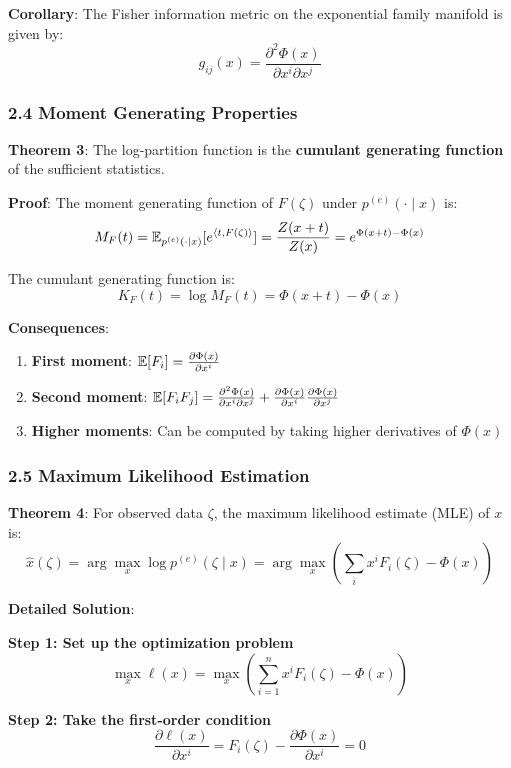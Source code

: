\documentclass{amsart}
\let\originalmathbb\mathbb
\renewcommand{\mathbb}[1]{%
    \ifstrequal{#1}{1}{\mathbbm{#1}}{\originalmathbb{#1}}%
}
\theoremstyle{plain}
\theoremstyle{definition}
\theoremstyle{remark}
\begin{document}
\textbf{Corollary}: The Fisher information metric on the exponential family manifold is given by:
\[
g_{ij}(x) = \frac{\partial^2 \Phi(x)}{\partial x^i \partial x^j}
\]

\subsubsection{2.4 Moment Generating Properties}

\textbf{Theorem 3}: The log-partition function is the \textbf{cumulant generating function} of the sufficient statistics.

\textbf{Proof}: The moment generating function of $F(\zeta)$ under $p^{(e)}(\cdot \mid x)$ is:
\[
M_F(t) = \mathbb{E}_{p^{(e)}(\cdot \mid x)}[e^{\langle t, F(\zeta) \rangle}] = \frac{Z(x + t)}{Z(x)} = e^{\Phi(x + t) - \Phi(x)}
\]

The cumulant generating function is:
\[
K_F(t) = \log M_F(t) = \Phi(x + t) - \Phi(x)
\]

\textbf{Consequences}:

\begin{enumerate}
	\item \textbf{First moment}: $\mathbb{E}[F_i] = \frac{\partial \Phi(x)}{\partial x^i}$
	\item \textbf{Second moment}: $\mathbb{E}[F_i F_j] = \frac{\partial^2 \Phi(x)}{\partial x^i \partial x^j} + \frac{\partial \Phi(x)}{\partial x^i} \frac{\partial \Phi(x)}{\partial x^j}$
	\item \textbf{Higher moments}: Can be computed by taking higher derivatives of $\Phi(x)$
\end{enumerate}

\subsubsection{2.5 Maximum Likelihood Estimation}

\textbf{Theorem 4}: For observed data $\zeta$, the maximum likelihood estimate (MLE) of $x$ is:
\[
\widehat{x}(\zeta) = \arg\max_x \log p^{(e)}(\zeta \mid x) = \arg\max_x \left( \sum_{i}x^{i}F_i(\zeta) - \Phi(x) \right)
\]

\textbf{Detailed Solution}:

\textbf{Step 1: Set up the optimization problem}
\[
\max_x \ell(x) = \max_x \left( \sum_{i=1}^n x^{i}F_i(\zeta) - \Phi(x) \right)
\]

\textbf{Step 2: Take the first-order condition}
\[
\frac{\partial \ell(x)}{\partial x^i} = F_i(\zeta) - \frac{\partial \Phi(x)}{\partial x^i} = 0
\]
\end{document}
